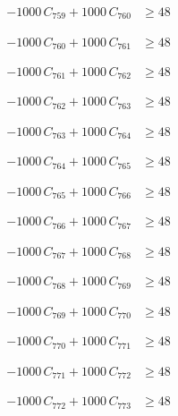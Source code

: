 \documentclass[a4paper,11pt]{article}
\begin{document}
\begin{align}
-1000\,C_{759} + 1000\,C_{760} &\geq 48 \nonumber
\end{align}

\begin{align}
-1000\,C_{760} + 1000\,C_{761} &\geq 48 \nonumber
\end{align}

\begin{align}
-1000\,C_{761} + 1000\,C_{762} &\geq 48 \nonumber
\end{align}

\begin{align}
-1000\,C_{762} + 1000\,C_{763} &\geq 48 \nonumber
\end{align}

\begin{align}
-1000\,C_{763} + 1000\,C_{764} &\geq 48 \nonumber
\end{align}

\begin{align}
-1000\,C_{764} + 1000\,C_{765} &\geq 48 \nonumber
\end{align}

\begin{align}
-1000\,C_{765} + 1000\,C_{766} &\geq 48 \nonumber
\end{align}

\begin{align}
-1000\,C_{766} + 1000\,C_{767} &\geq 48 \nonumber
\end{align}

\begin{align}
-1000\,C_{767} + 1000\,C_{768} &\geq 48 \nonumber
\end{align}

\begin{align}
-1000\,C_{768} + 1000\,C_{769} &\geq 48 \nonumber
\end{align}

\begin{align}
-1000\,C_{769} + 1000\,C_{770} &\geq 48 \nonumber
\end{align}

\begin{align}
-1000\,C_{770} + 1000\,C_{771} &\geq 48 \nonumber
\end{align}

\begin{align}
-1000\,C_{771} + 1000\,C_{772} &\geq 48 \nonumber
\end{align}

\begin{align}
-1000\,C_{772} + 1000\,C_{773} &\geq 48 \nonumber
\end{align}
\end{document}
